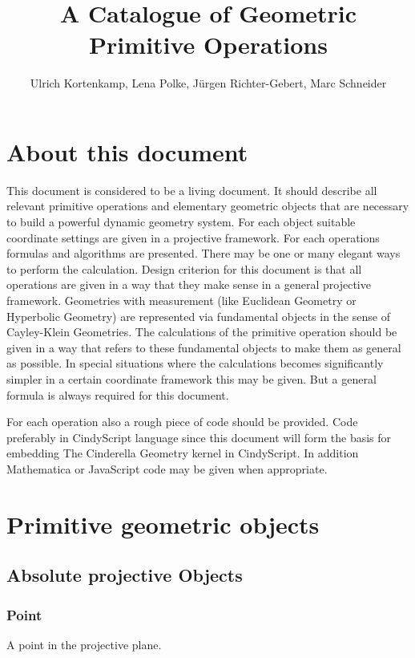 \documentclass[11pt]{article}
\title{A Catalogue of Geometric Primitive Operations}
\author{
Ulrich Kortenkamp, 
Lena Polke,
J\"urgen Richter-Gebert,
Marc Schneider
} %
\date{}					%
\begin{document}
\maketitle

\thispagestyle{empty}

\section*{About this document}
This document is considered to be a living document. It should describe all relevant primitive operations and elementary geometric objects that are necessary to build a powerful dynamic geometry system. For each object suitable coordinate settings are given in a projective framework. For each operations formulas and algorithms are presented.
There may be one or many elegant ways to perform the calculation. Design criterion for this document is that all operations are given in a way that they make sense in a general projective framework. Geometries with measurement (like Euclidean Geometry or Hyperbolic Geometry) are represented via fundamental objects in the sense of Cayley-Klein Geometries. The calculations of the primitive operation should be given in a way that refers to these fundamental objects to make them as general as possible. In special situations where the calculations becomes significantly simpler in a certain coordinate framework this may be given. But a general formula is always required for this document.

For each operation also a rough piece of code should be provided. Code preferably in CindyScript language since this document will form the basis for embedding The Cinderella Geometry kernel 
in CindyScript. In addition Mathematica or JavaScript code may be given when appropriate.
\newpage

\section{Primitive geometric objects}

\subsection{Absolute projective Objects}
\subsubsection{Point}
 A point in the projective plane.
\end{document}
